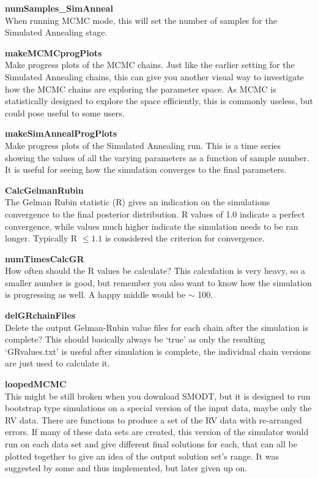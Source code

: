 \documentclass[12pt,preprint]{aastex}
\begin{document}
{\bf numSamples\_SimAnneal}\\
When running MCMC mode, this will set the number of samples for the Simulated Annealing stage.

{\bf makeMCMCprogPlots}\\
Make progress plots of the MCMC chains.  Just like the earlier setting for the Simulated Annealing chains, this can give you another visual way to investigate how the MCMC chains are exploring the parameter space.  As MCMC is statistically designed to explore the space efficiently, this is commonly useless, but could pose useful to some users.

{\bf makeSimAnnealProgPlots}\\
Make progress plots of the Simulated Annealing run.  This is a time series showing the values of all the varying parameters as a function of sample number.  It is useful for seeing how the simulation converges to the final parameters.

{\bf CalcGelmanRubin}\\
The Gelman Rubin statistic (R) gives an indication on the simulations convergence to the final posterior distribution.  R values of 1.0 indicate a perfect convergence, while values much higher indicate the simulation needs to be ran longer.  Typically R $\leq1.1$ is considered the criterion for convergence.

{\bf numTimesCalcGR}\\
How often should the R values be calculate?  This calculation is very heavy, so a smaller number is good, but remember you also want to know how the simulation is progressing as well.  A happy middle would be $\sim$ 100.

{\bf delGRchainFiles}\\
Delete the output Gelman-Rubin value files for each chain after the simulation is complete?  This should basically always be `true' as only the resulting `GRvalues.txt' is useful after simulation is complete, the individual chain versions are just used to calculate it. 

{\bf\color{red} loopedMCMC}\\
This might be still broken when you download SMODT, but it is designed to run bootstrap type simulations on a special version of the input data, maybe only the RV data.  There are functions to produce a set of the RV data with re-arranged errors.  If many of these data sets are created, this version of the simulator would run on each data set and give different final solutions for each, that can all be plotted together to give an idea of the output solution set's range.  It was suggested by some and thus implemented, but later given up on.
\end{document}
